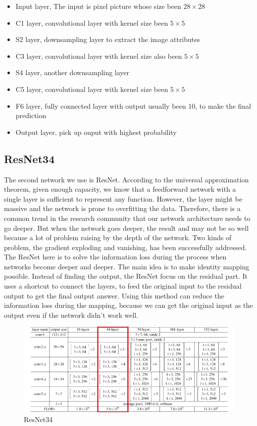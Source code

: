 \documentclass[12pt]{article}
\begin{document}
\begin{itemize}
    \item Input layer, The input is pixel picture whose size been $28\times 28$
    \item C1 layer, convolutional layer with kernel size been $5\times 5$
    \item S2 layer, downsampling layer to extract the image attributes
    \item C3 layer, convolutional layer with kernel size also been $5\times 5$
    \item S4 layer, another downsampling layer 
    \item C5 layer, convolutional layer with kernel size been $5\times 5$
    \item F6 layer, fully connected layer with output usually been 10, to make the final prediction
    \item Output layer, pick up ouput with highest probability
\end{itemize}

\subsection{ResNet34}
The second network we use is ResNet. According to the universal approximation theorem, given enough capacity, we know that a feedforward network with a single layer is sufficient to represent any function. However, the layer might be massive and the network is prone to overfitting the data. Therefore, there is a common trend in the research community that our network architecture needs to go deeper. But when the network goes deeper, the result and may not be so well because a lot of problem raising by the depth of the network. Two kinds of problem, the gradient exploding and vanishing, has been successfully addressed. The ResNet here is to solve the information loss during the process when networks become deeper and deeper. The main idea is to make identity mapping possible. Instead of finding the output, the ResNet focus on the residual part. It uses a shortcut to connect the layers, to feed the original input to the residual output to get the final output answer. Using this method can reduce the information loss during the mapping, because we can get the original input as the output even if the network didn’t work well.

\begin{figure}[H]
    \centering
    \includegraphics[scale = 0.9]{modelpic/resnet.png}
    \caption{ResNet34}
    \label{}
\end{figure}
\end{document}
